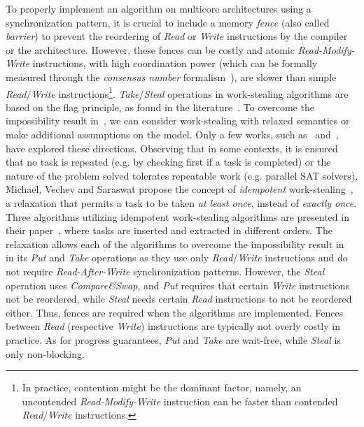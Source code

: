 To properly implement an algorithm on multicore architectures using a synchronization pattern, it is crucial to include a memory \emph{fence} (also called \emph{barrier}) to prevent the reordering of \emph{Read} or \emph{Write} instructions by the compiler or the architecture. However, these fences can be costly and atomic \emph{Read-Modify-Write} instructions, with high coordination power (which can be formally measured through the \emph{consensus number} formalism~\cite{DBLP_journals_toplas_Herlihy91}), are slower than simple \emph{Read}/\emph{Write} instructions\footnote{In practice, contention might be the dominant factor, namely, an uncontended \emph{Read-Modify-Write} instruction can be faster than contended \emph{Read}/\emph{Write} instructions.}. \emph{Take}/\emph{Steal} operations in work-stealing algorithms are based on the flag principle, as found in the literature~\cite{circular.work.stealing, DBLP_conf_pldi_FrigoLR98, non.blocking.work.stealing, 10.1145.571825.571876}. To overcome the impossibility result in~\cite{DBLP_conf_popl_AttiyaGHKMV11}, we can consider work-stealing with relaxed semantics or make additional assumptions on the model. Only a few works, such as~\cite{maged.vechev.2009} and~\cite{fencefreework}, have explored these directions. Observing that in some contexts, it is ensured that no task is repeated (e.g. by checking first if a task is completed) or the nature of the problem solved tolerates repeatable work (e.g. parallel SAT solvers), Michael, Vechev and Saraswat propose the concept of \emph{idempotent} work-stealing~\cite{maged.vechev.2009}, a relaxation that permits a task to be taken \emph{at least once}, instead of \emph{exactly once}.  Three algorithms utilizing idempotent work-stealing algorithms are presented in their paper~\cite{maged.vechev.2009},  where tasks are inserted and extracted in different orders.  The relaxation allows each of the algorithms to overcome the impossibility result in~\cite{DBLP_conf_popl_AttiyaGHKMV11} in its \emph{Put} and \emph{Take} operations as they use only \emph{Read}/\emph{Write} instructions and do not require \emph{Read-After-Write} synchronization patterns. However, the \emph{Steal} operation uses \emph{Compare\&Swap}, and \emph{Put} requires that certain \emph{Write} instructions not be reordered, while \emph{Steal} needs certain \emph{Read} instructions to not be reordered either. Thus, fences are required when the algorithms are implemented. Fences between \emph{Read} (respective \emph{Write}) instructions are typically not overly costly in practice. As for progress guarantees, \emph{Put} and \emph{Take} are wait-free, while \emph{Steal} is only non-blocking.

